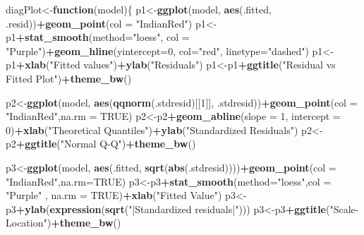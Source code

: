 \documentclass[12pt]{article}
\newenvironment{Shaded}{\begin{snugshade}}{\end{snugshade}}
\newcommand{\ControlFlowTok}[1]{\textcolor[rgb]{0.13,0.29,0.53}{\textbf{#1}}}
\newcommand{\DataTypeTok}[1]{\textcolor[rgb]{0.13,0.29,0.53}{#1}}
\newcommand{\DecValTok}[1]{\textcolor[rgb]{0.00,0.00,0.81}{#1}}
\newcommand{\KeywordTok}[1]{\textcolor[rgb]{0.13,0.29,0.53}{\textbf{#1}}}
\newcommand{\NormalTok}[1]{#1}
\newcommand{\OperatorTok}[1]{\textcolor[rgb]{0.81,0.36,0.00}{\textbf{#1}}}
\newcommand{\OtherTok}[1]{\textcolor[rgb]{0.56,0.35,0.01}{#1}}
\newcommand{\StringTok}[1]{\textcolor[rgb]{0.31,0.60,0.02}{#1}}
\begin{document}
\begin{Shaded}
\begin{Highlighting}[]
\NormalTok{diagPlot<-}\ControlFlowTok{function}\NormalTok{(model)\{}
\NormalTok{    p1<-}\KeywordTok{ggplot}\NormalTok{(model, }\KeywordTok{aes}\NormalTok{(.fitted, .resid))}\OperatorTok{+}\KeywordTok{geom_point}\NormalTok{(}\DataTypeTok{col =} \StringTok{"IndianRed"}\NormalTok{)}
\NormalTok{    p1<-p1}\OperatorTok{+}\KeywordTok{stat_smooth}\NormalTok{(}\DataTypeTok{method=}\StringTok{"loess"}\NormalTok{, }\DataTypeTok{col =} \StringTok{"Purple"}\NormalTok{)}\OperatorTok{+}\KeywordTok{geom_hline}\NormalTok{(}\DataTypeTok{yintercept=}\DecValTok{0}\NormalTok{, }\DataTypeTok{col=}\StringTok{"red"}\NormalTok{, }\DataTypeTok{linetype=}\StringTok{"dashed"}\NormalTok{)}
\NormalTok{    p1<-p1}\OperatorTok{+}\KeywordTok{xlab}\NormalTok{(}\StringTok{"Fitted values"}\NormalTok{)}\OperatorTok{+}\KeywordTok{ylab}\NormalTok{(}\StringTok{"Residuals"}\NormalTok{)}
\NormalTok{    p1<-p1}\OperatorTok{+}\KeywordTok{ggtitle}\NormalTok{(}\StringTok{"Residual vs Fitted Plot"}\NormalTok{)}\OperatorTok{+}\KeywordTok{theme_bw}\NormalTok{()}
    
\NormalTok{    p2<-}\KeywordTok{ggplot}\NormalTok{(model, }\KeywordTok{aes}\NormalTok{(}\KeywordTok{qqnorm}\NormalTok{(.stdresid)[[}\DecValTok{1}\NormalTok{]], .stdresid))}\OperatorTok{+}\KeywordTok{geom_point}\NormalTok{(}\DataTypeTok{col =} \StringTok{"IndianRed"}\NormalTok{,}\DataTypeTok{na.rm =} \OtherTok{TRUE}\NormalTok{)}
\NormalTok{    p2<-p2}\OperatorTok{+}\KeywordTok{geom_abline}\NormalTok{(}\DataTypeTok{slope =} \DecValTok{1}\NormalTok{, }\DataTypeTok{intercept =} \DecValTok{0}\NormalTok{)}\OperatorTok{+}\KeywordTok{xlab}\NormalTok{(}\StringTok{"Theoretical Quantiles"}\NormalTok{)}\OperatorTok{+}\KeywordTok{ylab}\NormalTok{(}\StringTok{"Standardized Residuals"}\NormalTok{)}
\NormalTok{    p2<-p2}\OperatorTok{+}\KeywordTok{ggtitle}\NormalTok{(}\StringTok{"Normal Q-Q"}\NormalTok{)}\OperatorTok{+}\KeywordTok{theme_bw}\NormalTok{()}
    
\NormalTok{    p3<-}\KeywordTok{ggplot}\NormalTok{(model, }\KeywordTok{aes}\NormalTok{(.fitted, }\KeywordTok{sqrt}\NormalTok{(}\KeywordTok{abs}\NormalTok{(.stdresid))))}\OperatorTok{+}\KeywordTok{geom_point}\NormalTok{(}\DataTypeTok{col =} \StringTok{"IndianRed"}\NormalTok{,}\DataTypeTok{na.rm=}\OtherTok{TRUE}\NormalTok{)}
\NormalTok{    p3<-p3}\OperatorTok{+}\KeywordTok{stat_smooth}\NormalTok{(}\DataTypeTok{method=}\StringTok{"loess"}\NormalTok{,}\DataTypeTok{col =} \StringTok{"Purple"}\NormalTok{ , }\DataTypeTok{na.rm =} \OtherTok{TRUE}\NormalTok{)}\OperatorTok{+}\KeywordTok{xlab}\NormalTok{(}\StringTok{"Fitted Value"}\NormalTok{)}
\NormalTok{    p3<-p3}\OperatorTok{+}\KeywordTok{ylab}\NormalTok{(}\KeywordTok{expression}\NormalTok{(}\KeywordTok{sqrt}\NormalTok{(}\StringTok{"|Standardized residuals|"}\NormalTok{)))}
\NormalTok{    p3<-p3}\OperatorTok{+}\KeywordTok{ggtitle}\NormalTok{(}\StringTok{"Scale-Location"}\NormalTok{)}\OperatorTok{+}\KeywordTok{theme_bw}\NormalTok{()}
    

\end{Highlighting}
\end{Shaded}
\end{document}

